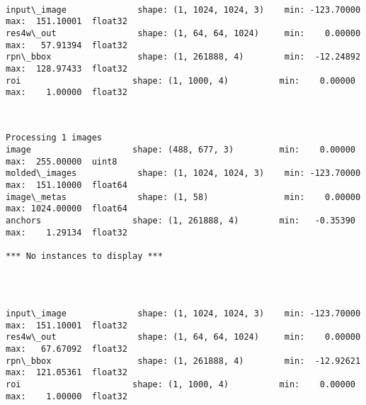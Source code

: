 \documentclass[11pt]{article}
\begin{document}
    \begin{center}
    \end{center}
    { \hspace*{\fill} \\}
    
    \begin{Verbatim}[commandchars=\\\{\}]
input\_image              shape: (1, 1024, 1024, 3)    min: -123.70000  max:  151.10001  float32
res4w\_out                shape: (1, 64, 64, 1024)     min:    0.00000  max:   57.91394  float32
rpn\_bbox                 shape: (1, 261888, 4)        min:  -12.24892  max:  128.97433  float32
roi                      shape: (1, 1000, 4)          min:    0.00000  max:    1.00000  float32

    \end{Verbatim}

    \begin{center}
    \end{center}
    { \hspace*{\fill} \\}
    
    \begin{Verbatim}[commandchars=\\\{\}]
Processing 1 images
image                    shape: (488, 677, 3)         min:    0.00000  max:  255.00000  uint8
molded\_images            shape: (1, 1024, 1024, 3)    min: -123.70000  max:  151.10000  float64
image\_metas              shape: (1, 58)               min:    0.00000  max: 1024.00000  float64
anchors                  shape: (1, 261888, 4)        min:   -0.35390  max:    1.29134  float32

*** No instances to display *** 


    \end{Verbatim}

    \begin{center}
    \end{center}
    { \hspace*{\fill} \\}
    
    \begin{Verbatim}[commandchars=\\\{\}]
input\_image              shape: (1, 1024, 1024, 3)    min: -123.70000  max:  151.10001  float32
res4w\_out                shape: (1, 64, 64, 1024)     min:    0.00000  max:   67.67092  float32
rpn\_bbox                 shape: (1, 261888, 4)        min:  -12.92621  max:  121.05361  float32
roi                      shape: (1, 1000, 4)          min:    0.00000  max:    1.00000  float32

    \end{Verbatim}
\end{document}
